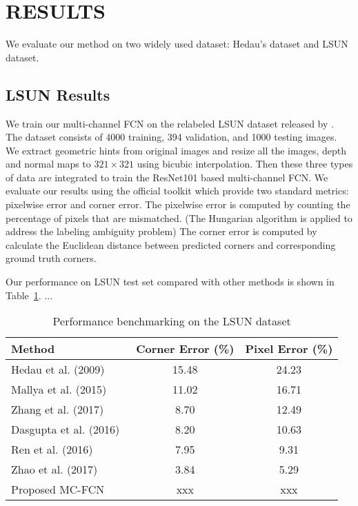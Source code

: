 \section{RESULTS}
\label{sec:Res}

We evaluate our method on two widely used dataset: Hedau's dataset \cite{hedau2009recovering} and LSUN dataset.
\subsection{LSUN Results}
\label{sec:LSUN}
We train our multi-channel FCN on the relabeled LSUN dataset released by \cite{ren2016coarse}. The dataset consists of 4000 training, 394 validation, and 1000 testing images. We extract geometric hints from original images and resize all the images, depth and normal maps to $321\times321$ using bicubic interpolation. Then these three types of data are integrated to train the ResNet101 based multi-channel FCN. We evaluate our results using the official toolkit which provide two standard metrics: pixelwise error and corner error. The pixelwise error is computed by counting the percentage of pixels that are mismatched. (The Hungarian algorithm is applied to address the labeling ambiguity problem) The corner error is computed by calculate the Euclidean distance between predicted corners and corresponding ground truth corners.

Our performance on LSUN test set compared with other methods is shown in Table~\ref{table:comparison-lsun}. ... 

\begin{table}
	\centering 
	\caption{Performance benchmarking on the LSUN dataset}
	\label{table:comparison-lsun}
	\begin{tabular}{l|c|c}
		\hline 
		Method & Corner Error (\%) & Pixel Error (\%) \\
		\hline
		Hedau et al. (2009)~\cite{hedau2009recovering} & 15.48 & 24.23 \\
		Mallya et al. (2015)~\cite{mallya2015learning} & 11.02 & 16.71 \\
		Zhang et al. (2017)~\cite{zhang2017learning} & 8.70 & 12.49 \\
		Dasgupta et al. (2016)~\cite{dasgupta2016delay} & 8.20 & 10.63 \\
		Ren et al. (2016)~\cite{ren2016three} & 7.95 & 9.31 \\
		Zhao et al. (2017)~\cite{zhao2017physics} & 3.84 & 5.29 \\
		Proposed MC-FCN & xxx & xxx \\
		\hline
	\end{tabular}
\end{table}

